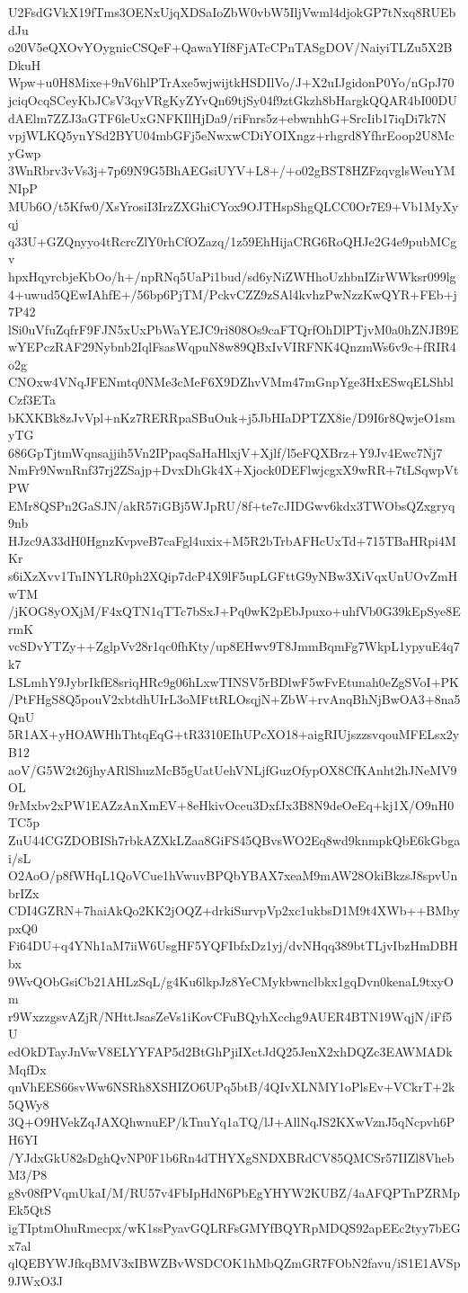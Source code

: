 U2FsdGVkX19fTms3OENxUjqXDSaIoZbW0vbW5IljVwml4djokGP7tNxq8RUEbdJu
o20V5eQXOvYOygnicCSQeF+QawaYIf8FjATcCPnTASgDOV/NaiyiTLZu5X2BDkuH
Wpw+u0H8Mixe+9nV6hlPTrAxe5wjwijtkHSDIlVo/J+X2uIJgidonP0Yo/nGpJ70
jciqOcqSCeyKbJCsV3qyVRgKyZYvQn69tjSy04f9ztGkzh8bHargkQQAR4bI00DU
dAElm7ZZJ3aGTF6leUxGNFKIlHjDa9/riFnrs5z+ebwnhhG+SrcIib17iqDi7k7N
vpjWLKQ5ynYSd2BYU04mbGFj5eNwxwCDiYOIXngz+rhgrd8YfhrEoop2U8McyGwp
3WnRbrv3vVs3j+7p69N9G5BhAEGsiUYV+L8+/+o02gBST8HZFzqvglsWeuYMNIpP
MUb6O/t5Kfw0/XsYrosiI3IrzZXGhiCYox9OJTHspShgQLCC0Or7E9+Vb1MyXyqj
q33U+GZQnyyo4tRcrcZlY0rhCfOZazq/1z59EhHijaCRG6RoQHJe2G4e9pubMCgv
hpxHqyrcbjeKbOo/h+/npRNq5UaPi1bud/sd6yNiZWHhoUzhbnIZirWWksr099lg
4+uwud5QEwIAhfE+/56bp6PjTM/PckvCZZ9zSAl4kvhzPwNzzKwQYR+FEb+j7P42
lSi0uVfuZqfrF9FJN5xUxPbWaYEJC9ri808Os9caFTQrfOhDlPTjvM0a0hZNJB9E
wYEPczRAF29Nybnb2IqlFsasWqpuN8w89QBxIvVIRFNK4QnzmWs6v9c+fRIR4o2g
CNOxw4VNqJFENmtq0NMe3cMeF6X9DZhvVMm47mGnpYge3HxESwqELShblCzf3ETa
bKXKBk8zJvVpl+nKz7RERRpaSBuOuk+j5JbHIaDPTZX8ie/D9I6r8QwjeO1smyTG
686GpTjtmWqnsajjih5Vn2IPpaqSaHaHlxjV+Xjlf/l5eFQXBrz+Y9Jv4Ewc7Nj7
NmFr9NwnRnf37rj2ZSajp+DvxDhGk4X+Xjock0DEFlwjcgxX9wRR+7tLSqwpVtPW
EMr8QSPn2GaSJN/akR57iGBj5WJpRU/8f+te7cJIDGwv6kdx3TWObsQZxgryq9nb
HJzc9A33dH0HgnzKvpveB7caFgl4uxix+M5R2bTrbAFHcUxTd+715TBaHRpi4MKr
s6iXzXvv1TnINYLR0ph2XQip7dcP4X9lF5upLGFttG9yNBw3XiVqxUnUOvZmHwTM
/jKOG8yOXjM/F4xQTN1qTTc7bSxJ+Pq0wK2pEbJpuxo+uhfVb0G39kEpSye8ErmK
vcSDvYTZy++ZglpVv28r1qc0fhKty/up8EHwv9T8JmmBqmFg7WkpL1ypyuE4q7k7
LSLmhY9JybrIkfE8sriqHRc9g06hLxwTINSV5rBDlwF5wFvEtunah0eZgSVoI+PK
/PtFHgS8Q5pouV2xbtdhUIrL3oMFttRLOsqjN+ZbW+rvAnqBhNjBwOA3+8na5QnU
5R1AX+yHOAWHhThtqEqG+tR3310EIhUPcXO18+aigRIUjszzsvqouMFELsx2yB12
aoV/G5W2t26jhyARlShuzMcB5gUatUehVNLjfGuzOfypOX8CfKAnht2hJNeMV9OL
9rMxbv2xPW1EAZzAnXmEV+8eHkivOceu3DxfJx3B8N9deOeEq+kj1X/O9nH0TC5p
ZuU44CGZDOBISh7rbkAZXkLZaa8GiFS45QBvsWO2Eq8wd9knmpkQbE6kGbgai/sL
O2AoO/p8fWHqL1QoVCue1hVwuvBPQbYBAX7xeaM9mAW28OkiBkzsJ8spvUnbrIZx
CDI4GZRN+7haiAkQo2KK2jOQZ+drkiSurvpVp2xc1ukbsD1M9t4XWb++BMbypxQ0
Fi64DU+q4YNh1aM7iiW6UsgHF5YQFIbfxDz1yj/dvNHqq389btTLjvIbzHmDBHbx
9WvQObGsiCb21AHLzSqL/g4Ku6lkpJz8YeCMykbwnclbkx1gqDvn0kenaL9txyOm
r9WxzzgsvAZjR/NHttJsasZeVs1iKovCFuBQyhXcchg9AUER4BTN19WqjN/iFf5U
edOkDTayJnVwV8ELYYFAP5d2BtGhPjiIXctJdQ25JenX2xhDQZc3EAWMADkMqfDx
qnVhEES66svWw6NSRh8XSHIZO6UPq5btB/4QIvXLNMY1oPlsEv+VCkrT+2k5QWy8
3Q+O9HVekZqJAXQhwnuEP/kTnuYq1aTQ/lJ+AllNqJS2KXwVznJ5qNcpvh6PH6YI
/YJdxGkU82sDghQvNP0F1b6Rn4dTHYXgSNDXBRdCV85QMCSr57IIZl8VhebM3/P8
g8v08fPVqmUkaI/M/RU57v4FbIpHdN6PbEgYHYW2KUBZ/4aAFQPTnPZRMpEk5QtS
igTIptmOhuRmecpx/wK1ssPyavGQLRFsGMYfBQYRpMDQS92apEEc2tyy7bEGx7al
qlQEBYWJfkqBMV3xIBWZBvWSDCOK1hMbQZmGR7FObN2favu/iS1E1AVSp9JWxO3J
